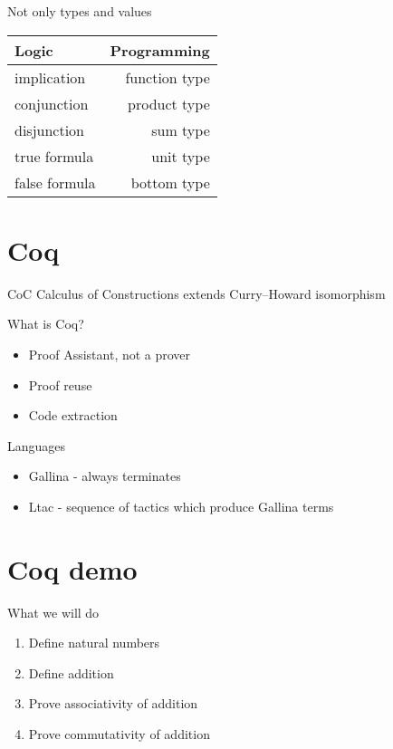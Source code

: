 \documentclass[17pt]{beamer}
\begin{document}
\begin{frame}{Not only types and values}
\begin{table}
\begin{tabular}{ l | r }
Logic & Programming \\
\hline \hline
implication 	& function type \\
conjunction 	& product type \\
disjunction 	& sum type \\
true formula 	& unit type \\
false formula 	& bottom type \\
\end{tabular}
\end{table}
\end{frame}

\section{Coq}

\begin{frame}{CoC}
Calculus of Constructions extends Curry–Howard isomorphism
\end{frame}

\begin{frame}{What is Coq?}
	\begin{center}
		\begin{itemize}
			\item Proof Assistant, not a prover
			\item Proof reuse
			\item Code extraction
		\end{itemize}
	\end{center}
\end{frame}

\begin{frame}{Languages}
	\begin{center}
		\begin{itemize}
			\item Gallina - always terminates
			\item Ltac - sequence of tactics which produce Gallina terms 
		\end{itemize}
	\end{center}
\end{frame}


\section{Coq demo}

\begin{frame}{What we will do}
	\begin{enumerate}
		\item Define natural numbers
		\item Define addition
		\item Prove associativity of addition
		\item Prove commutativity of addition 
	\end{enumerate}
\end{frame}
\end{document}
